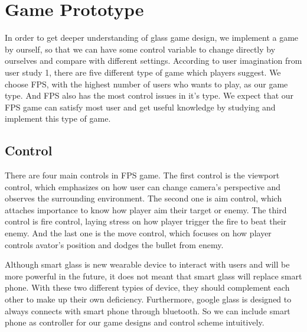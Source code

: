 \documentclass{sigchi}
\begin{document}

\section{Game Prototype}

In order to get deeper understanding of glass game design, we implement a game by ourself, so that we can have some control variable to change directly by ourselves and compare with different settings. 
According to user imagination from user study 1, there are five different type of game which players suggest. We choose FPS, with the highest number of users who wants to play, as our game type.
And FPS also has the most control issues in it's type. 
We expect that our FPS game can satisfy most user and get  useful knowledge by studying and implement this type of game.

\subsection{Control}
There are four main controls in FPS game. 
The first control is the viewport control, which emphasizes on how user can change camera's perspective and observes the surrounding environment.
The second one is aim control, which attaches importance to  know how player aim their target or enemy. 
The third control is fire control, laying stress on how player trigger the fire to beat their enemy. 
And the last one is the move control, which focuses on how  player controls avator's position and dodges the bullet from enemy.

Although smart glass is new wearable device to interact with users and will be more powerful in the future, it does not meant that smart glass will replace smart phone\cite{lecture}. 
With these two different typies of device, they should complement each other to make up their own deficiency.
Furthermore, google glass is designed to always connects with smart phone through bluetooth. So we can include smart phone as controller for our game designs and control scheme intuitively.
\end{document}
